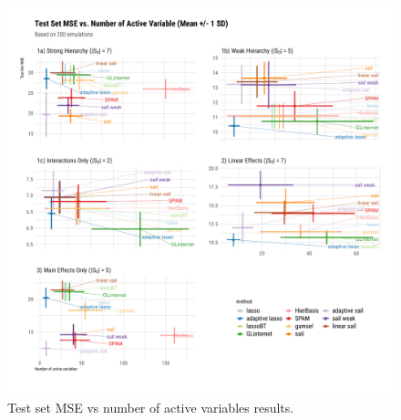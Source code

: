\begin{knitrout}\scriptsize
	\color{fgcolor}\begin{figure}[H]
		
		{\centering \includegraphics[width=1\linewidth]{figs/plot-mse-nactive-sim-1} 
			
		}
		
		\caption[Test set MSE vs number of active variables results]{Test set MSE vs number of active variables results.}\label{fig:plot-mse-nactive-sim}
	\end{figure}
	
	
\end{knitrout}



